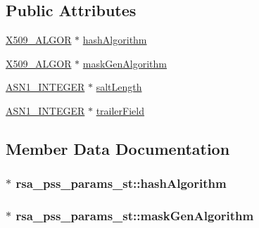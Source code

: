 \subsection*{Public Attributes}
\begin{DoxyCompactItemize}
\item 
\hyperlink{ossl__typ_8h_aa2b6185e6254f36f709cd6577fb5022e}{X509\+\_\+\+A\+L\+G\+OR} $\ast$ \hyperlink{structrsa__pss__params__st_aac829ac297745706cbaf333d81b4de9e}{hash\+Algorithm}
\item 
\hyperlink{ossl__typ_8h_aa2b6185e6254f36f709cd6577fb5022e}{X509\+\_\+\+A\+L\+G\+OR} $\ast$ \hyperlink{structrsa__pss__params__st_a39f7b07fe870a2d415ca2edd68e68889}{mask\+Gen\+Algorithm}
\item 
\hyperlink{ossl__typ_8h_af4335399bf9774cb410a5e93de65998b}{A\+S\+N1\+\_\+\+I\+N\+T\+E\+G\+ER} $\ast$ \hyperlink{structrsa__pss__params__st_aa3831adeab05f41488cc226fff064091}{salt\+Length}
\item 
\hyperlink{ossl__typ_8h_af4335399bf9774cb410a5e93de65998b}{A\+S\+N1\+\_\+\+I\+N\+T\+E\+G\+ER} $\ast$ \hyperlink{structrsa__pss__params__st_a67aede448229164c1c5e359c3020ae53}{trailer\+Field}
\end{DoxyCompactItemize}


\subsection{Member Data Documentation}
\subsubsection[{\texorpdfstring{hash\+Algorithm}{hashAlgorithm}}]{$\ast$ rsa\+\_\+pss\+\_\+params\+\_\+st\+::hash\+Algorithm}\hypertarget{structrsa__pss__params__st_aac829ac297745706cbaf333d81b4de9e}{}\label{structrsa__pss__params__st_aac829ac297745706cbaf333d81b4de9e}
\subsubsection[{\texorpdfstring{mask\+Gen\+Algorithm}{maskGenAlgorithm}}]{$\ast$ rsa\+\_\+pss\+\_\+params\+\_\+st\+::mask\+Gen\+Algorithm}\hypertarget{structrsa__pss__params__st_a39f7b07fe870a2d415ca2edd68e68889}{}\label{structrsa__pss__params__st_a39f7b07fe870a2d415ca2edd68e68889}

